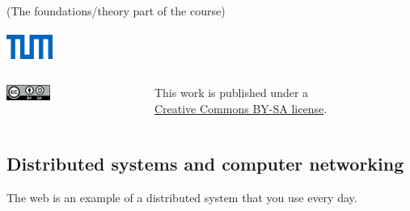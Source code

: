 \begin{frame}[plain]
    \label{s:title}
    \begin{center}
        \textbf{\huge{\color{tumblue}{Distributed Systems}}} \\[0.5em]
        (The foundations/theory part of the course)\\[1em]
        \mydetails\\[1em]
        \includegraphics[width=1.5cm]{images/tum-logo.png}\\[2em]
    \end{center}
    \begin{columns}[totalwidth=9cm]
        \begin{column}{4cm}
            \hfill\includegraphics[height=0.5cm]{images/creative-commons.png}\hspace{5pt}
        \end{column}
        \begin{column}{5cm}\scriptsize
            This work is published under a\\\href{https://creativecommons.org/licenses/by-sa/4.0/}{Creative Commons BY-SA license}.
        \end{column}
    \end{columns}
\end{frame}

\subsection{Distributed systems and computer networking}\label{sec:networking}

The web is an example of a distributed system that you use every day.

